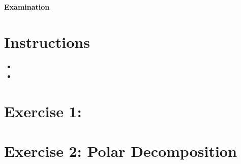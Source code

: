 

\lstset{
  language=Algo,
  basicstyle=\sffamily,
  columns=fullflexible,
  mathescape
}

\begin{center}
{\large\textbf{Examination}}\\
\end{center}

\noindent\makebox[\linewidth]{\rule{\linewidth}{0.6pt}}
 
\section{Instructions}

\begin{itemize}
\item
\item
\end{itemize}



\noindent\makebox[\linewidth]{\rule{\linewidth}{0.6pt}}

\section{Exercise 1: }

\section{Exercise 2: Polar Decomposition}



